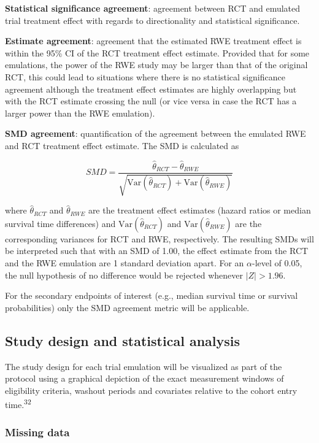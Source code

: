 \documentclass[
  letterpaper,
  DIV=11,
  numbers=noendperiod]{scrartcl}
\begin{document}
\textbf{Statistical significance agreement}: agreement between RCT and
emulated trial treatment effect with regards to directionality and
statistical significance.

\textbf{Estimate agreement}: agreement that the estimated RWE treatment
effect is within the 95\% CI of the RCT treatment effect estimate.
Provided that for some emulations, the power of the RWE study may be
larger than that of the original RCT, this could lead to situations
where there is no statistical significance agreement although the
treatment effect estimates are highly overlapping but with the RCT
estimate crossing the null (or vice versa in case the RCT has a larger
power than the RWE emulation).

\textbf{SMD agreement}: quantification of the agreement between the
emulated RWE and RCT treatment effect estimate. The SMD is calculated as

\[
SMD = \frac{\hat{\theta}_{RCT} - \hat{\theta}_{RWE}}{\sqrt{\text{Var}(\hat{\theta}_{RCT}) + \text{Var}(\hat{\theta}_{RWE})}}
\]

where \(\hat{\theta}_{RCT}\) and \(\hat{\theta}_{RWE}\) are the
treatment effect estimates (hazard ratios or median survival time
differences) and \(\text{Var}(\hat{\theta}_{RCT})\) and
\(\text{Var}(\hat{\theta}_{RWE})\) are the corresponding variances for
RCT and RWE, respectively. The resulting SMDs will be interpreted such
that with an SMD of 1.00, the effect estimate from the RCT and the RWE
emulation are 1 standard deviation apart. For an \(\alpha\)-level of
0.05, the null hypothesis of no difference would be rejected whenever
\(|Z| > 1.96\).

For the secondary endpoints of interest (e.g., median survival time or
survival probabilities) only the SMD agreement metric will be
applicable.

\subsection{Study design and statistical
analysis}\label{study-design-and-statistical-analysis}

The study design for each trial emulation will be visualized as part of
the protocol using a graphical depiction of the exact measurement
windows of eligibility criteria, washout periods and covariates relative
to the cohort entry time.\textsuperscript{32}

\subsubsection{Missing data}\label{missing-data}
\end{document}
